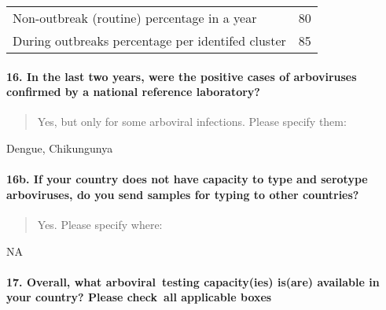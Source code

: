 \documentclass[
]{article}
\begin{document}
\begin{longtable}[]{@{}lr@{}}
\toprule
\endhead
Non-outbreak (routine) percentage in a year & 80 \\
During outbreaks percentage per identifed cluster & 85 \\
\bottomrule
\end{longtable}

\hypertarget{in-the-last-two-years-were-the-positive-cases-of-arboviruses-confirmed-by-a-national-reference-laboratory}{%
\paragraph{16. In the last two years, were the positive cases of
arboviruses confirmed by a national reference
laboratory?}\label{in-the-last-two-years-were-the-positive-cases-of-arboviruses-confirmed-by-a-national-reference-laboratory}}

\begin{quote}
Yes, but only for some arboviral infections. Please specify them:
\end{quote}

Dengue, Chikungunya

\hypertarget{b.-if-your-country-does-not-have-capacity-to-type-and-serotype-arboviruses-do-you-send-samples-for-typing-to-other-countries}{%
\paragraph{16b. If your country does not have capacity to type and
serotype arboviruses, do you send samples for typing to other
countries?}\label{b.-if-your-country-does-not-have-capacity-to-type-and-serotype-arboviruses-do-you-send-samples-for-typing-to-other-countries}}

\begin{quote}
Yes. Please specify where:
\end{quote}

NA

\hypertarget{overall-what-arboviral-testing-capacityies-isare-available-in-your-country-please-check-all-applicable-boxes}{%
\paragraph{17. Overall, what arboviral~testing capacity(ies) is(are)
available in your country? Please check~all applicable
boxes}\label{overall-what-arboviral-testing-capacityies-isare-available-in-your-country-please-check-all-applicable-boxes}}
\end{document}
